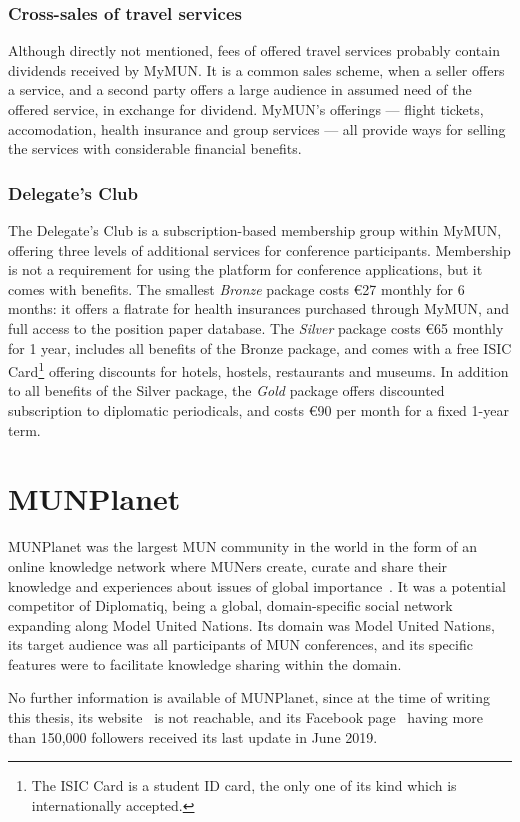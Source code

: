 \subsubsection{Cross-sales of travel services}

Although directly not mentioned, fees of offered travel services probably contain dividends received by MyMUN. It is a common sales scheme, when a seller offers a service, and a second party offers a large audience in assumed need of the offered service, in exchange for dividend. MyMUN's offerings — flight tickets, accomodation, health insurance and group services — all provide ways for selling the services with considerable financial benefits.

\subsubsection{Delegate's Club}

The Delegate's Club is a subscription-based membership group within MyMUN, offering three levels of additional services for conference participants. Membership is not a requirement for using the platform for conference applications, but it comes with benefits. The smallest \emph{Bronze} package costs €27 monthly for 6 months: it offers a flatrate for health insurances purchased through MyMUN, and full access to the position paper database. The \emph{Silver} package costs €65 monthly for 1 year, includes all benefits of the Bronze package, and comes with a free ISIC Card\footnote{The ISIC Card is a student ID card, the only one of its kind which is internationally accepted.} offering discounts for hotels, hostels, restaurants and museums. In addition to all benefits of the Silver package, the \emph{Gold} package offers discounted subscription to diplomatic periodicals, and costs €90 per month for a fixed 1-year term.

\section{MUNPlanet}

MUNPlanet was the largest MUN community in the world in the form of an online knowledge network where MUNers create, curate and share their knowledge and experiences about issues of global importance~\cite{munplanetfacebook}. It was a potential competitor of Diplomatiq, being a global, domain-specific social network expanding along Model United Nations. Its domain was Model United Nations, its target audience was all participants of MUN conferences, and its specific features were to facilitate knowledge sharing within the domain.

No further information is available of MUNPlanet, since at the time of writing this thesis, its website~\cite{munplanetwebsite} is not reachable, and its Facebook page~\cite{munplanetfacebook} having more than 150,000 followers received its last update in June 2019.
